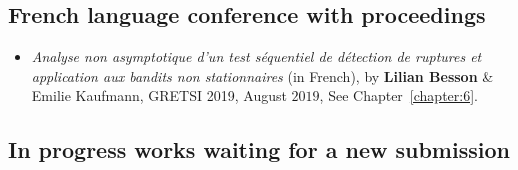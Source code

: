 \subsection*{French language conference with proceedings}

\begin{itemize}
\item
    \emph{Analyse non asymptotique d'un test séquentiel de détection de ruptures et application aux bandits non stationnaires} (in French),
    by \textbf{Lilian Besson} \& Emilie Kaufmann,
    GRETSI 2019,
    August $2019$,
    See Chapter~\ref{chapter:6}.
    \cite{Besson2019Gretsi}

\end{itemize}


\subsection*{In progress works waiting for a new submission}

